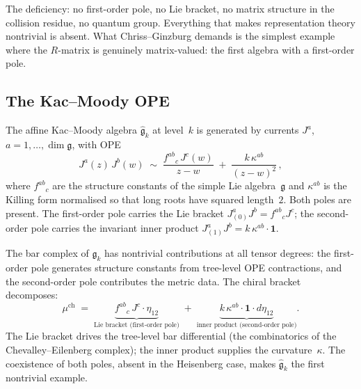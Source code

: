The deficiency: no first-order pole, no Lie bracket, no matrix
structure in the collision residue, no quantum group. Everything
that makes representation theory nontrivial is absent. What
Chriss--Ginzburg demands is the simplest example where the $R$-matrix
is genuinely matrix-valued: the first algebra with a first-order
pole.


\subsection*{The Kac--Moody OPE}

The affine Kac--Moody algebra $\widehat{\mathfrak g}_k$ at
level~$k$ is generated by currents
$J^a$, $a = 1,\dots,\dim\mathfrak g$, with OPE
\begin{equation}\label{eq:pf1-km-ope}
J^a(z)\,J^b(w)
\;\sim\;
\frac{f^{ab}{}_{c}\,J^c(w)}{z-w}
\;+\;
\frac{k\,\kappa^{ab}}{(z-w)^2}\,,
\end{equation}
where $f^{ab}{}_{c}$ are the structure constants of the simple Lie
algebra~$\mathfrak g$ and $\kappa^{ab}$ is the Killing form
normalised so that long roots have squared length~$2$. Both poles
are present. The first-order pole carries the Lie bracket
$J^a_{(0)}J^b = f^{ab}{}_{c}J^c$; the second-order pole carries
the invariant inner product
$J^a_{(1)}J^b = k\,\kappa^{ab}\cdot\mathbf 1$.

The bar complex of $\widehat{\mathfrak g}_k$ has nontrivial
contributions at all tensor degrees: the first-order pole generates
structure constants from tree-level OPE contractions, and the
second-order pole contributes the metric data. The chiral bracket
decomposes:
\begin{equation}\label{eq:pf1-km-bracket}
\mu^{\mathrm{ch}}
\;=\;
\underbrace{f^{ab}{}_{c}\,J^c\cdot\eta_{12}}_{\text{Lie bracket
(first-order pole)}}
\;+\;
\underbrace{k\,\kappa^{ab}\cdot\mathbf 1\cdot
d\eta_{12}}_{\text{inner product (second-order pole)}}.
\end{equation}
The Lie bracket drives the tree-level bar differential
(the combinatorics of the Chevalley--Eilenberg complex); the inner
product supplies the curvature~$\kappa$. The coexistence of both
poles, absent in the Heisenberg case, makes
$\widehat{\mathfrak g}_k$ the first nontrivial example.

